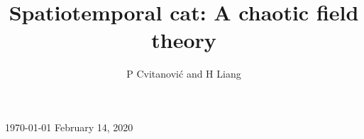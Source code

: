\documentclass[12pt]{iopart}
\begin{document}
\title[Spatiotemporal cat]
{Spatiotemporal cat: A chaotic field theory} %

    \author{
P Cvitanovi{\'c}
         and
H Liang
    }\address{
Center for Nonlinear Science, School of Physics,
            Georgia Institute of Technology,
            Atlanta, GA 30332-0430, USA
    } 
    \vspace{10pt}
    \begin{indented}
    \item[]
    \ifboyscout\today\else
February 14, 2020
    \fi
    \end{indented}

    \begin{abstract}
    \PCedit{

    }
    \end{abstract}



\submitto{\NL}
    \ifsubmission
\maketitle %
    \fi

\renewcommand{\statesp}{phase space}
\renewcommand{\Statesp}{Phase space}
\renewcommand{\stateDsp}{phase-space}
\renewcommand{\StateDsp}{Phase-space}


    \ifboyscout\clearpage\fi

    \ifboyscout\clearpage\fi


\renewcommand{\statesp}{state space}
\renewcommand{\Statesp}{State space}
\renewcommand{\stateDsp}{state-space}
\renewcommand{\StateDsp}{State-space}

    \ifboyscout\clearpage\fi

    \ifboyscout\clearpage\fi

    \ifboyscout\clearpage\fi

    \ifboyscout\clearpage\fi

\end{document}
